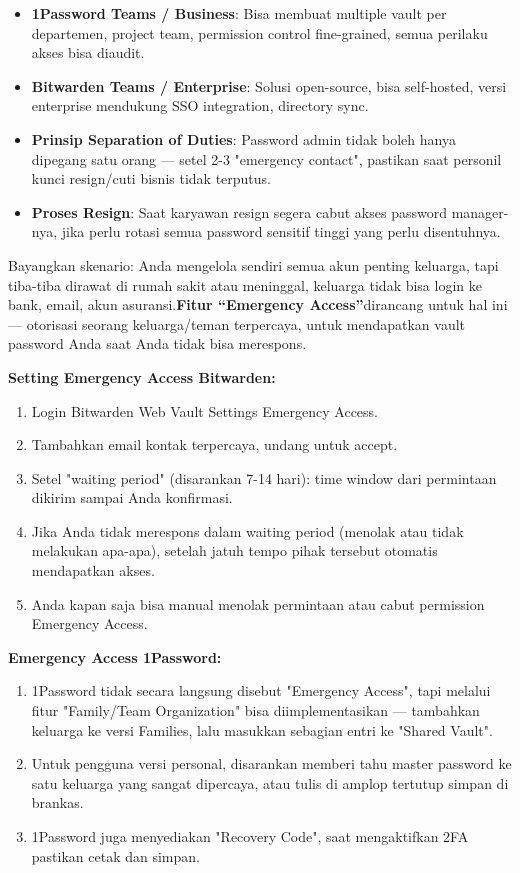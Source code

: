 \begin{itemize}
  \item \textbf{1Password Teams / Business}: Bisa membuat multiple vault per departemen, project team, permission control fine-grained, semua perilaku akses bisa diaudit.
  \item \textbf{Bitwarden Teams / Enterprise}: Solusi open-source, bisa self-hosted, versi enterprise mendukung SSO integration, directory sync.
  \item \textbf{Prinsip Separation of Duties}: Password admin tidak boleh hanya dipegang satu orang — setel 2-3 "emergency contact", pastikan saat personil kunci resign/cuti bisnis tidak terputus.
  \item \textbf{Proses Resign}: Saat karyawan resign segera cabut akses password manager-nya, jika perlu rotasi semua password sensitif tinggi yang perlu disentuhnya.
\end{itemize}


Bayangkan skenario: Anda mengelola sendiri semua akun penting keluarga, tapi tiba-tiba dirawat di rumah sakit atau meninggal, keluarga tidak bisa login ke bank, email, akun asuransi.\textbf{Fitur “Emergency Access”}dirancang untuk hal ini — otorisasi seorang keluarga/teman terpercaya, untuk mendapatkan vault password Anda saat Anda tidak bisa merespons.

\textbf{Setting Emergency Access Bitwarden:}

\begin{enumerate}
  \item Login Bitwarden Web Vault Settings Emergency Access.
  \item Tambahkan email kontak terpercaya, undang untuk accept.
  \item Setel "waiting period" (disarankan 7-14 hari): time window dari permintaan dikirim sampai Anda konfirmasi.
  \item Jika Anda tidak merespons dalam waiting period (menolak atau tidak melakukan apa-apa), setelah jatuh tempo pihak tersebut otomatis mendapatkan akses.
  \item Anda kapan saja bisa manual menolak permintaan atau cabut permission Emergency Access.
\end{enumerate}

\textbf{Emergency Access 1Password:}

\begin{enumerate}
  \item 1Password tidak secara langsung disebut "Emergency Access", tapi melalui fitur "Family/Team Organization" bisa diimplementasikan — tambahkan keluarga ke versi Families, lalu masukkan sebagian entri ke "Shared Vault".
  \item Untuk pengguna versi personal, disarankan memberi tahu master password ke satu keluarga yang sangat dipercaya, atau tulis di amplop tertutup simpan di brankas.
  \item 1Password juga menyediakan "Recovery Code", saat mengaktifkan 2FA pastikan cetak dan simpan.
\end{enumerate}

